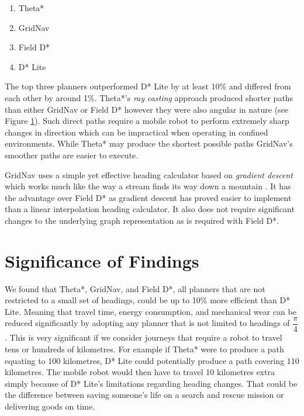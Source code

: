 \begin{enumerate}
\item Theta*
\item GridNav
\item Field D*
\item D* Lite
\end{enumerate}

\noindent
The top three planners outperformed D* Lite by at least 10\% and differed from each other by around 1\%. Theta*'s \textit{ray casting} approach produced shorter paths than either GridNav or Field D* however they were also angular in nature (see Figure \ref{}). Such direct paths require a mobile robot to perform extremely sharp changes in direction which can be impractical when operating in confined environments. While Theta* may produce the shortest possible paths GridNav's smoother paths are easier to execute.  

\newpage

\noindent
GridNav uses a simple yet effective heading calculator based on \textit{gradient descent} which works much like the way a stream finds its way down a mountain \cite{GRIDNAV95}. It has the advantage over Field D* as gradient descent has proved easier to implement than a linear interpolation heading calculator. It also does not require significant changes to the underlying graph representation as is required with Field D*.

\newpage

\section{Significance of Findings}
We found that Theta*, GridNav, and Field D*, all planners that are not restricted to a small set of headings, could be up to 10\% more efficient than D* Lite. Meaning that travel time, energy consumption, and mechanical wear can be reduced significantly by adopting any planner that is not limited to headings of $\dfrac{\pi}{4}$. This is very significant if we consider journeys that require a robot to travel tens or hundreds of kilometres. For example if Theta* were to produce a path equating to 100 kilometres, D* Lite could potentially produce a path covering 110 kilometres. The mobile robot would then have to travel 10 kilometres extra simply because of D* Lite's limitations regarding heading changes. That could be the difference between saving someone's life on a search and rescue mission or delivering goods on time. \\

